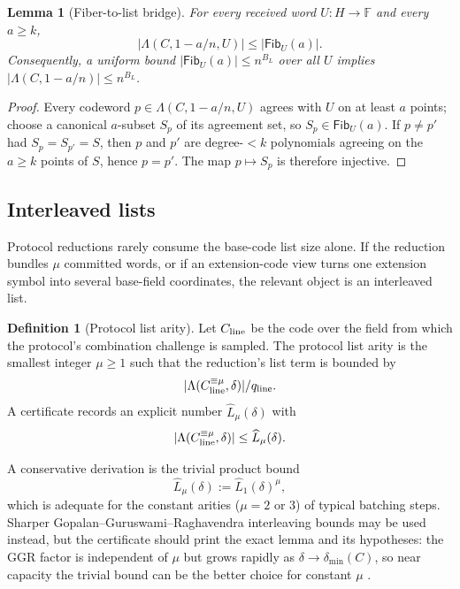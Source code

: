 \documentclass[11pt]{article}
\newtheorem{lemma}[theorem]{Lemma}
\theoremstyle{definition}
\newtheorem{definition}[theorem]{Definition}
\newcommand{\F}{\mathbb F}
\newcommand{\qline}{q_{\rm line}}
\newcommand{\Fib}{\mathsf{Fib}}
\newcommand{\Int}[2]{#1^{\equiv #2}}
\begin{document}
\begin{lemma}[Fiber-to-list bridge]
\label{lem:fiber-list}
For every received word $U:H\to\F$ and every $a\ge k$,
\[
        |\Lambda(C,1-a/n,U)|\le |\Fib_U(a)| .
\]
Consequently, a uniform bound $|\Fib_U(a)|\le n^{B_L}$ over all $U$ implies $|\Lambda(C,1-a/n)|\le n^{B_L}$.
\end{lemma}

\begin{proof}
Every codeword $p\in\Lambda(C,1-a/n,U)$ agrees with $U$ on at least $a$ points; choose a canonical $a$-subset $S_p$ of its agreement set, so $S_p\in\Fib_U(a)$.  If $p\ne p'$ had $S_p=S_{p'}=S$, then $p$ and $p'$ are degree-$<k$ polynomials agreeing on the $a\ge k$ points of $S$, hence $p=p'$.  The map $p\mapsto S_p$ is therefore injective.
\end{proof}

\subsection{Interleaved lists}
\label{sec:interleaved}

Protocol reductions rarely consume the base-code list size alone.  If the reduction bundles $\mu$ committed words, or if an extension-code view turns one extension symbol into several base-field coordinates, the relevant object is an interleaved list.

\begin{definition}[Protocol list arity]
\label{def:list-arity}
Let $C_{\rm line}$ be the code over the field from which the protocol's combination challenge is sampled.  The protocol list arity is the smallest integer $\mu\ge1$ such that the reduction's list term is bounded by
\[
        |\Lambda(\Int{C_{\rm line}}{\mu},\delta)|/\qline .
\]
A certificate records an explicit number $\widehat L_{\mu}(\delta)$ with
\[
        |\Lambda(\Int{C_{\rm line}}{\mu},\delta)|
        \le \widehat L_{\mu}(\delta).
\]
\end{definition}

A conservative derivation is the trivial product bound
\begin{equation}
\label{eq:trivial-interleaving}
        \widehat L_{\mu}(\delta)
        :=\widehat L_1(\delta)^{\mu},
\end{equation}
which is adequate for the constant arities ($\mu=2$ or $3$) of typical batching steps.  Sharper Gopalan--Guruswami--Raghavendra interleaving bounds may be used instead, but the certificate should print the exact lemma and its hypotheses: the GGR factor is independent of $\mu$ but grows rapidly as $\delta\to\delta_{\min}(C)$, so near capacity the trivial bound can be the better choice for constant $\mu$ \cite{GGR11,ABF26}.
\end{document}
